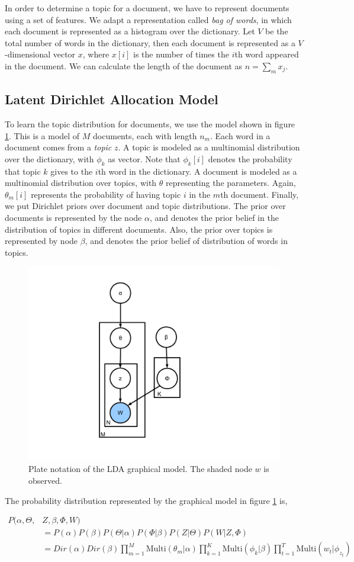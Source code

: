 \documentclass[twoside,12pt]{article}
\begin{document}
In order to determine a topic for a document, we have to represent  documents using a set of features. We adapt a representation called \emph{bag of words}, in which each document is represented as a histogram over the dictionary. Let $V$ be the total number of words in the dictionary, then each document is represented as a $V$-dimensional vector $x$, where $x[i]$ is the number of times the $i$th word appeared in the document. We can calculate the length of the document as $n=\sum_{m}x_j.$

\subsection{Latent Dirichlet Allocation Model}
To learn the topic distribution for documents, we use the model shown in figure \ref{figGM}. This is a model of $M$ documents, each with length $n_m$. Each word in a document comes from a \emph{topic} $z$. A topic is modeled as a multinomial distribution over the dictionary, with $\phi_k$ as vector. Note that $\phi_k[i]$ denotes the probability that topic $k$ gives to the $i$th word in the dictionary. A document is modeled as a multinomial distribution over topics, with $\theta$ representing the parameters. Again, $\theta_m[i]$ represents the probability of having topic $i$ in the $m$th document. Finally, we put Dirichlet priors over document and topic distributions. The prior over documents is represented by the node $\alpha$, and denotes the prior belief in the distribution of topics in different documents. Also, the prior over topics is represented by node $\beta$, and denotes the prior belief of distribution of words in topics.

\begin{figure}[h!]
\centering
\includegraphics[width=.3\textwidth]{./figs/gm.pdf}
\caption{Plate notation of the LDA graphical model. The shaded node $w$ is observed. }
\label{figGM}
\end{figure}

The probability distribution represented by the graphical model in figure \ref{figGM} is,

\begin{align}
P(\alpha,\Theta,&Z,\beta,\Phi,W)  \\  &=P(\alpha) P(\beta) P(\Theta | \alpha) P(\Phi|\beta) P(Z|\Theta) P(W|Z,\Phi) \\ &= Dir(\alpha) Dir(\beta) \prod_{m=1}^M \text{Multi}(\theta_m | \alpha) \prod_{k=1}^K \text{Multi}(\phi_k | \beta) \prod_{t=1}^T \text{Multi}(w_t | \phi_{z_t})
\end{align}
 
\end{document}
